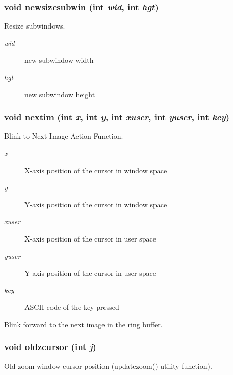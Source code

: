 \subsubsection{\setlength{\rightskip}{0pt plus 5cm}void newsizesubwin (int {\em wid}, int {\em hgt})}\label{xtv_8h_a87}


Resize subwindows. 

\begin{Desc}
\item[Parameters:]
\begin{description}
\item[{\em wid}]new subwindow width \item[{\em hgt}]new subwindow height \end{description}
\end{Desc}
\subsubsection{\setlength{\rightskip}{0pt plus 5cm}void nextim (int {\em x}, int {\em y}, int {\em xuser}, int {\em yuser}, int {\em key})}\label{xtv_8h_a110}


Blink to Next Image Action Function. 

\begin{Desc}
\item[Parameters:]
\begin{description}
\item[{\em x}]X-axis position of the cursor in window space \item[{\em y}]Y-axis position of the cursor in window space \item[{\em xuser}]X-axis position of the cursor in user space \item[{\em yuser}]Y-axis position of the cursor in user space \item[{\em key}]ASCII code of the key pressed\end{description}
\end{Desc}
Blink forward to the next image in the ring buffer. 
\subsubsection{\setlength{\rightskip}{0pt plus 5cm}void oldzcursor (int {\em j})}\label{xtv_8h_a99}


Old zoom-window cursor position (updatezoom() utility function). 


